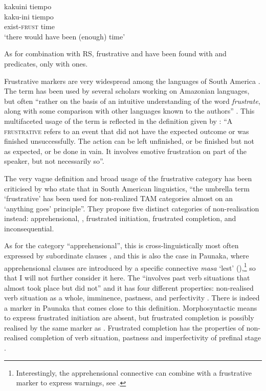 \ea\label{ex:new23-frust1}
\begingl
\glpreamble kakuini tiempo\\
\gla kaku-ini tiempo\\
\glb exist-\textsc{frust} time\\
\glft ‘there would have been (enough) time’
\endgl
\trailingcitation{[jxx-p110923l-1.345]}
\xe

As for combination with RS, frustrative and  have been found with  and  predicates,  only with  ones.

Frustrative markers are very widespread among the languages of South America \citep[291]{Campbell2012}. The term has been used by several scholars working on Amazonian languages, but often “rather on the basis of an intuitive understanding of the word \textit{frustrate}, along with some comparison with other languages known to the authors” \citep[478]{Overall2017}. This multifaceted usage of the term is reflected in the definition given by \citet[158]{Mueller2013}: “A \textsc{frustrative} refers to an event that did not have the expected outcome or was finished unsuccessfully. The action can be left unfinished, or be finished but not as expected, or be done in vain. It involves emotive frustration on part of the speaker, but not necessarily so”. 

The very vague definition and broad usage of the frustrative category has been criticised by \citet[880]{Kuteva2019} who state that in South American linguistics, “the umbrella term ‘frustrative’ has been used for non-realized TAM categories almost on an ‘anything goes’ principle”.  They propose five distinct categories of non-realisation instead: apprehensional, , frustrated initiation, frustrated completion, and inconsequential. 

As for the category “apprehensional”, this is cross-linguistically most often expressed by subordinate clauses \citep[863]{Kuteva2019}, and this is also the case in Paunaka, where apprehensional clauses are introduced by a specific connective \textit{masa} ‘lest’ (),\footnote{Interestingly, the apprehensional connective can combine with a frustrative marker to express warnings, see .} so that I will not further consider it here. The  “involves past verb situations that almost took place but did not” and it has four different properties: non-realised verb situation as a whole, imminence, pastness, and perfectivity \citep[866]{Kuteva2019}. There is indeed a marker in Paunaka that comes close to this definition. Morphosyntactic means to express frustrated initiation are absent, but frustrated completion is possibly realised by the same marker as . Frustrated completion has the properties of non-realised completion of verb situation, pastness and imperfectivity of prefinal stage \citep[872]{Kuteva2019}.

